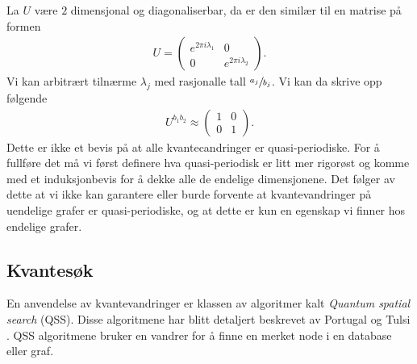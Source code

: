         La $U$ være $2$ dimensjonal og diagonaliserbar, da er den similær til en matrise på formen
        \begin{align*}
            U = \begin{pmatrix*}
                e^{2\pi i\lambda_1} & 0 \\
                0 & e^{2\pi i\lambda_2}
            \end{pmatrix*}.
        \end{align*}
        Vi kan arbitrært tilnærme $\lambda_j$ med rasjonalle tall $\sfrac{a_j}{b_j}$. Vi kan da skrive opp følgende
        \begin{align*}
            U^{b_1b_2} \approx \begin{pmatrix*}
                1 & 0 \\
                0 & 1
            \end{pmatrix*}.
        \end{align*}
        Dette er ikke et bevis på at alle kvantecandringer er quasi-periodiske. For å fullføre det må vi først definere hva quasi-periodisk er litt mer rigorøst og komme med et induksjonbevis for å dekke alle de endelige dimensjonene. Det følger av dette at vi ikke kan garantere eller burde forvente at kvantevandringer på uendelige grafer er quasi-periodiske, og at dette er kun en egenskap vi finner hos endelige grafer. 

\subsection{Kvantesøk}

        En anvendelse av kvantevandringer er klassen av algoritmer kalt \emph{Quantum spatial search} (QSS). Disse algoritmene har blitt detaljert beskrevet av Portugal \cite{portugal_2019} og Tulsi \cite{PhysRevA.86.042331}. QSS algoritmene bruker en vandrer for å finne en merket node i en database eller graf.

